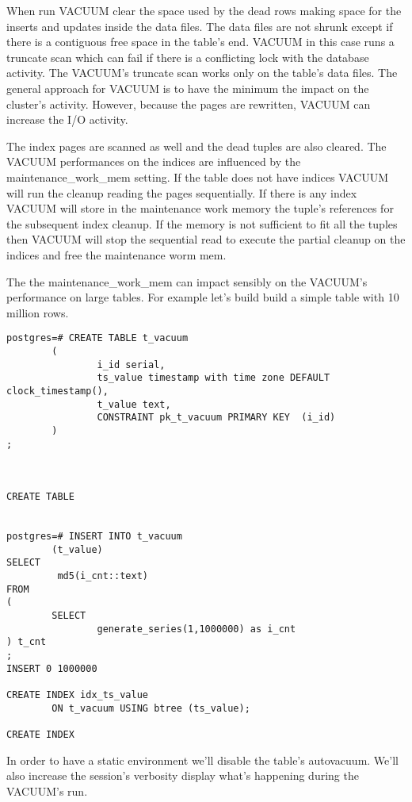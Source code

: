 When run VACUUM clear the space used by the dead rows making space for the inserts and updates inside the
data files. The data files are not shrunk except if there is a contiguous free space in the table's
end. VACUUM in this case runs a truncate scan which can fail if there is a conflicting lock with the
database activity. The VACUUM's truncate scan works only on the table's data files. The general approach
for VACUUM is to have the minimum the impact on the cluster's activity. However, because the pages are
rewritten, VACUUM can increase the I/O activity.\newline

The index pages are scanned as well and the dead tuples are also cleared. The VACUUM performances on the
indices are influenced by the maintenance\_work\_mem setting. If the table does not have indices VACUUM
will run the cleanup reading the pages sequentially. If there is any index VACUUM will store in the
maintenance work memory  the tuple's references for the subsequent index cleanup. If the memory is
not sufficient to fit all the tuples then VACUUM will stop the sequential read to execute the
partial cleanup on the indices and free the maintenance worm mem.\newline

The the maintenance\_work\_mem  can impact sensibly on the VACUUM's performance on large tables. For example
let's build build a simple table with 10 million rows.


\begin{lstlisting}[style=pgsql]
postgres=# CREATE TABLE t_vacuum
        (
                i_id serial,
                ts_value timestamp with time zone DEFAULT clock_timestamp(),
                t_value text,
                CONSTRAINT pk_t_vacuum PRIMARY KEY  (i_id)
        )
;



CREATE TABLE


postgres=# INSERT INTO t_vacuum
        (t_value)
SELECT
         md5(i_cnt::text)
FROM
(
        SELECT
                generate_series(1,1000000) as i_cnt
) t_cnt
;
INSERT 0 1000000

CREATE INDEX idx_ts_value
        ON t_vacuum USING btree (ts_value);

CREATE INDEX

\end{lstlisting}
In order to have a static environment we'll disable the table's autovacuum. We'll also increase the
session's verbosity display what's happening during the VACUUM's run.\newline

